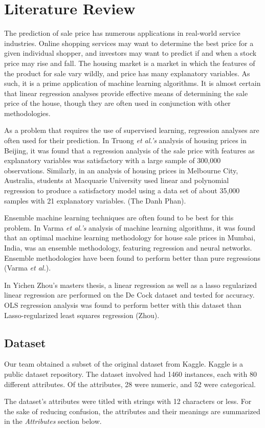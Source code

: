 \documentclass[12pt]{article}
\begin{document}
\section*{Literature Review}
\par \qquad The prediction of sale price has numerous applications in real-world service industries. Online shopping services may want to determine the best price for a given individual shopper, and investors may want to predict if and when a stock price may rise and fall. The housing market is a market in which the features of the product for sale vary wildly, and price has many explanatory variables. As such, it is a prime application of machine learning algorithms. It is almost certain that linear regression analyses provide effective means of determining the sale price of the house, though they are often used in conjunction with other methodologies.
\par As a problem that requires the use of supervised learning, regression analyses are often used for their prediction. In Truong \emph{et al.’s} analysis of housing prices in Beijing, it was found that a regression analysis of the sale price with features as explanatory variables was satisfactory with a large sample of 300,000 observations. Similarly, in an analysis of housing prices in Melbourne City, Australia, students at Macquarie University used linear and polynomial regression to produce a satisfactory model using a data set of about 35,000 samples with 21 explanatory variables. (The Danh Phan). 
\par Ensemble machine learning techniques are often found to be best for this problem. In Varma \emph{et al.’s} analysis of machine learning algorithms, it was found that an optimal machine learning methodology for house sale prices in Mumbai, India, was an ensemble methodology, featuring regression and neural networks. Ensemble methodologies have been found to perform better than pure regressions (Varma \emph{et al.}).
\par In Yichen Zhou’s masters thesis, a linear regression as well as a lasso regularized linear regression are performed on the De Cock dataset and tested for accuracy. OLS regression analysis was found to perform better with this dataset than Lasso-regularized least squares regression (Zhou).

\subsection{Dataset}
\par \qquad Our team obtained a subset of the original dataset from Kaggle. Kaggle is a public dataset repository. The dataset involved had 1460 instances, each with 80 different attributes. Of the attributes, 28 were numeric, and 52 were categorical.
\par The dataset’s attributes were titled with strings with 12 characters or less. For the sake of reducing confusion, the attributes and their meanings are summarized in the \emph{Attributes} section below.
\end{document}
